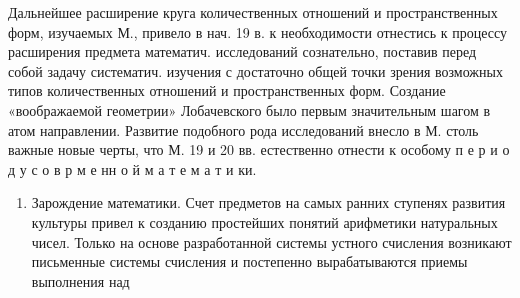 \documentclass[10pt]{article}
\begin{document}
Дальнейшее расширение круга количественных отношений и пространственных форм, изучаемых М., привело в нач. 19 в. к необходимости отнестись к процессу расширения предмета математич. исследований сознательно, поставив перед собой задачу систематич. изучения с достаточно общей точки зрения возможных типов количественных отношений и пространственных форм. Создание «воображаемой геометрии» Лобачевского было первым значительным шагом в атом направлении. Развитие подобного рода исследований внесло в М. столь важные новые черты, что М. 19 и 20 вв. естественно отнести к особому п е р и о д у с о в р м е нн о й м а т е м а т и ки.



\begin{enumerate}

  \item Зарождение математики. Счет предметов на самых ранних ступенях развития культуры привел к созданию простейших понятий арифметики натуральных чисел. Только на основе разработанной системы устного счисления возникают письменные системы счисления и постепенно вырабатываются приемы выполнения над

\end{enumerate}
\end{document}
